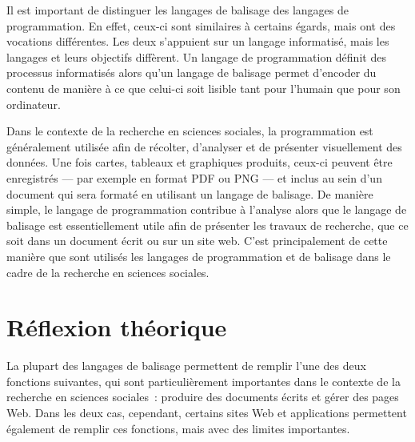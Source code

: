 \documentclass[
  letterpaper,
]{scrbook}
\begin{document}
Il est important de distinguer les langages de balisage des langages de
programmation. En effet, ceux-ci sont similaires à certains égards, mais
ont des vocations différentes. Les deux s'appuient sur un langage
informatisé, mais les langages et leurs objectifs diffèrent. Un langage
de programmation définit des processus informatisés alors qu'un langage
de balisage permet d'encoder du contenu de manière à ce que celui-ci
soit lisible tant pour l'humain que pour son ordinateur.

Dans le contexte de la recherche en sciences sociales, la programmation
est généralement utilisée afin de récolter, d'analyser et de présenter
visuellement des données. Une fois cartes, tableaux et graphiques
produits, ceux-ci peuvent être enregistrés --- par exemple en format PDF
ou PNG --- et inclus au sein d'un document qui sera formaté en utilisant
un langage de balisage. De manière simple, le langage de programmation
contribue à l'analyse alors que le langage de balisage est
essentiellement utile afin de présenter les travaux de recherche, que ce
soit dans un document écrit ou sur un site web. C'est principalement de
cette manière que sont utilisés les langages de programmation et de
balisage dans le cadre de la recherche en sciences sociales.

\hypertarget{ruxe9flexion-thuxe9orique-1}{%
\section{Réflexion théorique}\label{ruxe9flexion-thuxe9orique-1}}

La plupart des langages de balisage permettent de remplir l'une des deux
fonctions suivantes, qui sont particulièrement importantes dans le
contexte de la recherche en sciences sociales~: produire des documents
écrits et gérer des pages Web. Dans les deux cas, cependant, certains
sites Web et applications permettent également de remplir ces fonctions,
mais avec des limites importantes.
\end{document}
